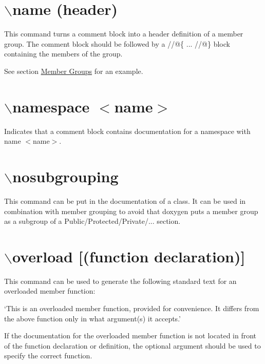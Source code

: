  \hypertarget{commands_cmdname}{}\section{$\backslash$name (header)}\label{commands_cmdname}

This command turns a comment block into a header definition of a member group. The comment block should be followed by a {\ttfamily //@\{ ... //@\}} block containing the members of the group.

See section \hyperlink{grouping_memgroup}{Member Groups} for an example.



 \hypertarget{commands_cmdnamespace}{}\section{$\backslash$namespace $<$name$>$}\label{commands_cmdnamespace}
 Indicates that a comment block contains documentation for a namespace with name $<$name$>$.



 \hypertarget{commands_cmdnosubgrouping}{}\section{$\backslash$nosubgrouping}\label{commands_cmdnosubgrouping}
 This command can be put in the documentation of a class. It can be used in combination with member grouping to avoid that doxygen puts a member group as a subgroup of a Public/Protected/Private/... section.



 \hypertarget{commands_cmdoverload}{}\section{$\backslash$overload \mbox{[}(function declaration)\mbox{]}}\label{commands_cmdoverload}
 This command can be used to generate the following standard text for an overloaded member function:

`This is an overloaded member function, provided for convenience. It differs from the above function only in what argument(s) it accepts.'

If the documentation for the overloaded member function is not located in front of the function declaration or definition, the optional argument should be used to specify the correct function.

